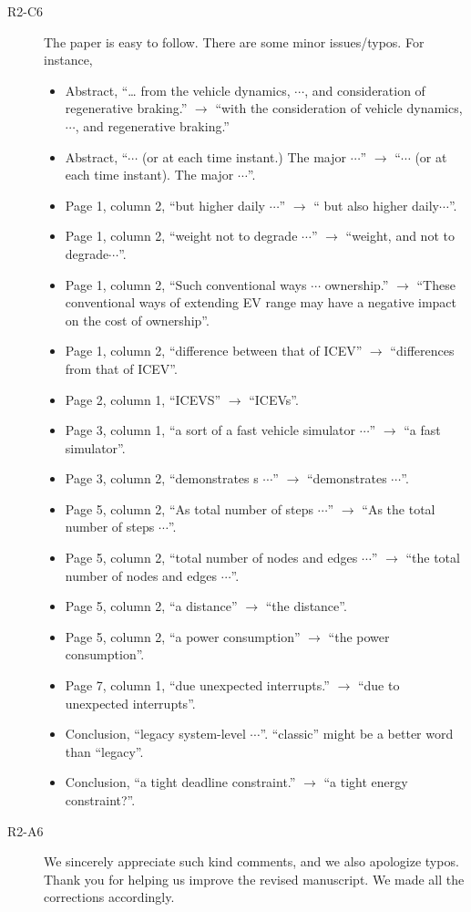 \documentclass[onecolumn]{IEEEconf}
\begin{document}
\begin{description}
\item [R2-C6] The paper is easy to follow. There are some minor issues/typos. For instance,
\begin{itemize}
\item Abstract, ``… from the vehicle dynamics, $\cdots$, and consideration of regenerative braking.'' $\rightarrow$ ``with the consideration of vehicle dynamics, $\cdots$, and regenerative braking.''
\item Abstract, ``$\cdots$ (or at each time instant.) The major $\cdots$'' $\rightarrow$ ``$\cdots$ (or at each time instant). The major $\cdots$''.
\item Page 1, column 2, ``but higher daily $\cdots$'' $\rightarrow$ `` but also higher daily$\cdots$''.
\item Page 1, column 2, ``weight not to degrade $\cdots$'' $\rightarrow$ ``weight, and not to degrade$\cdots$''.
\item Page 1, column 2, ``Such conventional ways $\cdots$ ownership.'' $\rightarrow$ ``These conventional ways of extending EV range may have a negative impact on the cost of ownership''.
\item Page 1, column 2, ``difference between that of ICEV'' $\rightarrow$ ``differences from that of ICEV''.
\item Page 2, column 1, ``ICEVS'' $\rightarrow$ ``ICEVs''.
\item Page 3, column 1, ``a sort of a fast vehicle simulator $\cdots$'' $\rightarrow$ ``a fast simulator''.
\item Page 3, column 2, ``demonstrates s $\cdots$'' $\rightarrow$ ``demonstrates $\cdots$''.
\item Page 5, column 2, ``As total number of steps $\cdots$'' $\rightarrow$ ``As the total number of steps $\cdots$''.
\item Page 5, column 2, ``total number of nodes and edges $\cdots$'' $\rightarrow$ ``the total number of nodes and edges $\cdots$''.
\item Page 5, column 2, ``a distance'' $\rightarrow$ ``the distance''.
\item Page 5, column 2, ``a power consumption'' $\rightarrow$ ``the power consumption''.
\item Page 7, column 1, ``due unexpected interrupts.'' $\rightarrow$ ``due to unexpected interrupts''.
\item Conclusion, ``legacy system-level $\cdots$''. ``classic” might be a better word than “legacy''.
\item Conclusion, ``a tight deadline constraint.'' $\rightarrow$ ``a tight energy constraint?''.
\end{itemize}

\item [R2-A6] We sincerely appreciate such kind comments, and we also apologize typos. Thank you for helping us improve the revised  manuscript. We made all the corrections accordingly. 
\end{description}
\end{document}
